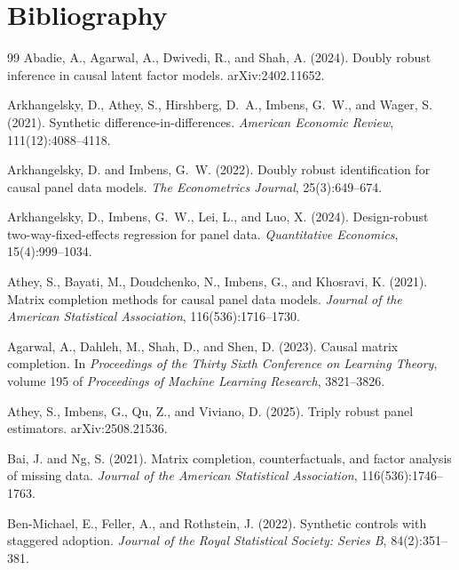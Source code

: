 \documentclass[11pt]{article}
\theoremstyle{definition}
\theoremstyle{plain}
\theoremstyle{remark}
\begin{document}
\section*{Bibliography}
\begin{thebibliography}{99}
Abadie, A., Agarwal, A., Dwivedi, R., and Shah, A. (2024).
\newblock Doubly robust inference in causal latent factor models.
\newblock arXiv:2402.11652.

Arkhangelsky, D., Athey, S., Hirshberg, D.~A., Imbens, G.~W., and Wager, S.
(2021).
\newblock Synthetic difference-in-differences.
\newblock \emph{American Economic Review}, 111(12):4088--4118.

Arkhangelsky, D. and Imbens, G.~W. (2022).
\newblock Doubly robust identification for causal panel data models.
\newblock \emph{The Econometrics Journal}, 25(3):649--674.

Arkhangelsky, D., Imbens, G.~W., Lei, L., and Luo, X. (2024).
\newblock Design-robust two-way-fixed-effects regression for panel data.
\newblock \emph{Quantitative Economics}, 15(4):999--1034.

Athey, S., Bayati, M., Doudchenko, N., Imbens, G., and Khosravi, K. (2021).
\newblock Matrix completion methods for causal panel data models.
\newblock \emph{Journal of the American Statistical Association},
116(536):1716--1730.

Agarwal, A., Dahleh, M., Shah, D., and Shen, D. (2023).
\newblock Causal matrix completion.
\newblock In \emph{Proceedings of the Thirty Sixth Conference on Learning
Theory}, volume 195 of \emph{Proceedings of Machine Learning Research},
3821--3826.

Athey, S., Imbens, G., Qu, Z., and Viviano, D. (2025).
\newblock Triply robust panel estimators.
\newblock arXiv:2508.21536.

Bai, J. and Ng, S. (2021).
\newblock Matrix completion, counterfactuals, and factor analysis of missing
data.
\newblock \emph{Journal of the American Statistical Association},
116(536):1746--1763.

Ben-Michael, E., Feller, A., and Rothstein, J. (2022).
\newblock Synthetic controls with staggered adoption.
\newblock \emph{Journal of the Royal Statistical Society: Series B},
84(2):351--381.


\end{thebibliography}
\end{document}
